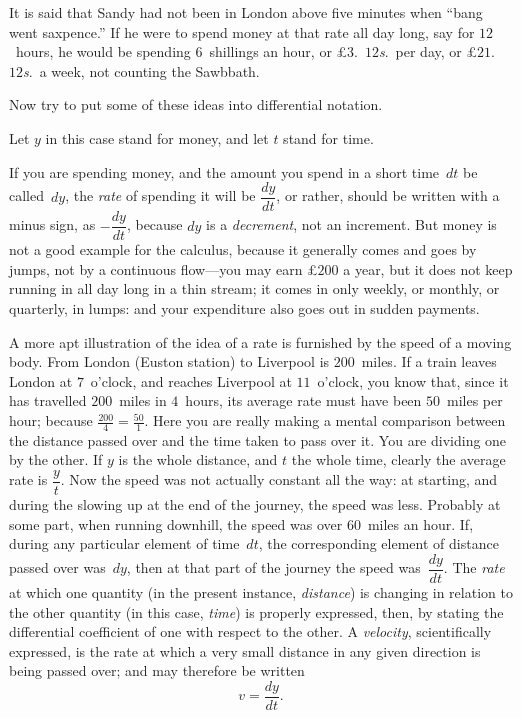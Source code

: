 \documentclass[12pt]{book}[2005/09/16]
\newcommand{\DPPageSep}[2]{\Pagelabel{#2}}
\newcommand{\Pagelabel}[1]
  {\phantomsection\label{#1}}
\begin{document}
It is said that Sandy had not been in London
\DPPageSep{066.png}{54}%
above five minutes when ``bang went saxpence.'' If
he were to spend money at that rate all day long,
say for $12$~hours, he would be spending $6$~shillings
an hour, or £$3$.~$12$\textit{s}.\ per day, or £$21$.~$12$\textit{s}.\ a week,
not counting the Sawbbath.

Now try to put some of these ideas into differential
notation.

Let $y$ in this case stand for money, and let $t$ stand
for time.

If you are spending money, and the amount you
spend in a short time~$dt$ be called~$dy$, the \emph{rate} of
spending it will be $\dfrac{dy}{dt}$, or rather, should be written
with a minus sign, as $-\dfrac{dy}{dt}$, because $dy$ is a \emph{decrement},
not an increment. But money is not a good example
for the calculus, because it generally comes and goes
by jumps, not by a continuous flow---you may earn
£$200$ a year, but it does not keep running in all
day long in a thin stream; it comes in only weekly,
or monthly, or quarterly, in lumps: and your expenditure
also goes out in sudden payments.

A more apt illustration of the idea of a rate is
furnished by the speed of a moving body. From
London (Euston station) to Liverpool is $200$~miles.
If a train leaves London at $7$~o'clock, and reaches
Liverpool at $11$~o'clock, you know that, since it has
travelled $200$~miles in $4$~hours, its average rate must
have been $50$~miles per hour; because $\frac{200}{4} = \frac{50}{1}$. Here
you are really making a mental comparison between
\DPPageSep{067.png}{55}%
the distance passed over and the time taken to pass
over it. You are dividing one by the other. If $y$ is
the whole distance, and $t$ the whole time, clearly the
average rate is $\dfrac{y}{t}$. Now the speed was not actually
constant all the way: at starting, and during the
slowing up at the end of the journey, the speed was
less. Probably at some part, when running downhill,
the speed was over $60$~miles an hour. If, during
any particular element of time~$dt$, the corresponding
element of distance passed over was~$dy$, then at that
part of the journey the speed was~$\dfrac{dy}{dt}$. The \emph{rate} at
which one quantity (in the present instance, \emph{distance})
is changing in relation to the other quantity (in this
case, \emph{time}) is properly expressed, then, by stating the
differential coefficient of one with respect to the other.
A \emph{velocity}, scientifically expressed, is the rate at which
a very small distance in any given direction is being
passed over; and may therefore be written
\[
v = \dfrac{dy}{dt}.
\]
\end{document}
